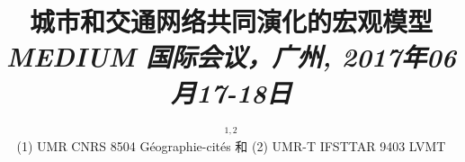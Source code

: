 




\title{城市和交通网络共同演化的宏观模型
\\\bigskip
\bigskip
\bigskip
\textit{MEDIUM 国际会议，广州, 2017年06月17-18日}\\
\textit{}
}\bigskip
\bigskip
\author{$^{1,2}$\\
\small(1) UMR CNRS 8504 Géographie-cités 和 (2) UMR-T IFSTTAR 9403 LVMT
}
\date{}

\maketitle

\justify




\vspace{0.2cm}






